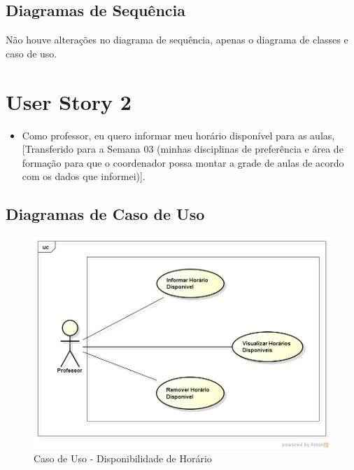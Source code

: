 \documentclass{abnt}
\begin{document}
		
		\subsection{Diagramas de Sequência}
		
		Não houve alterações no diagrama de sequência, apenas o diagrama de classes e caso de uso.
		
	
	\clearpage	
	\section{User Story 2}

		\begin{itemize}
			\item Como professor, eu quero informar meu horário disponível para as aulas, [Transferido para a Semana 03 (minhas disciplinas de preferência 
			e área de formação para que o coordenador possa montar a grade de aulas de acordo com os dados que informei)].
		\end{itemize}
		
			
		\subsection{Diagramas de Caso de Uso}
		\begin{figure}[h]
			\begin{center}
				 \includegraphics[width=450px]{CasoUsoDisponibilidadeHorario}
				 \caption{Caso de Uso - Disponibilidade de Horário}
				 \label{fig:CasoUsoDisponibilidadeHorario}
			\end{center}
		\end{figure}
		
\end{document}
